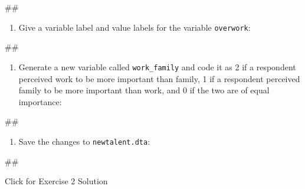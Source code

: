 \documentclass[
]{book}
\newenvironment{Shaded}{\begin{snugshade}}{\end{snugshade}}
\newcommand{\NormalTok}[1]{#1}
\providecommand{\tightlist}{%
  \setlength{\itemsep}{0pt}\setlength{\parskip}{0pt}}
\begin{document}
\begin{Shaded}
\begin{Highlighting}[]
\NormalTok{\#\#}
\end{Highlighting}
\end{Shaded}

\begin{enumerate}
\def\labelenumi{\arabic{enumi}.}
\setcounter{enumi}{5}
\tightlist
\item
  Give a variable label and value labels for the variable \texttt{overwork}:
\end{enumerate}

\begin{Shaded}
\begin{Highlighting}[]
\NormalTok{\#\#}
\end{Highlighting}
\end{Shaded}

\begin{enumerate}
\def\labelenumi{\arabic{enumi}.}
\setcounter{enumi}{6}
\tightlist
\item
  Generate a new variable called \texttt{work\_family} and code it as 2 if a respondent perceived work to be more important than family, 1 if a respondent perceived family to be more important than work, and 0 if the two are of equal importance:
\end{enumerate}

\begin{Shaded}
\begin{Highlighting}[]
\NormalTok{\#\#}
\end{Highlighting}
\end{Shaded}

\begin{enumerate}
\def\labelenumi{\arabic{enumi}.}
\setcounter{enumi}{7}
\tightlist
\item
  Save the changes to \texttt{newtalent.dta}:
\end{enumerate}

\begin{Shaded}
\begin{Highlighting}[]
\NormalTok{\#\#}
\end{Highlighting}
\end{Shaded}

{Click for Exercise 2 Solution}
\end{document}
